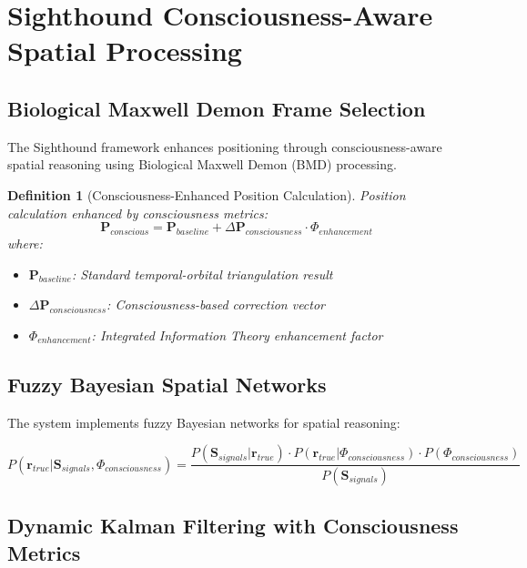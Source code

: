 \documentclass[12pt,a4paper]{article}
\newtheorem{definition}[theorem]{Definition}
\begin{document}
\section{Sighthound Consciousness-Aware Spatial Processing}

\subsection{Biological Maxwell Demon Frame Selection}

The Sighthound framework enhances positioning through consciousness-aware spatial reasoning using Biological Maxwell Demon (BMD) processing.

\begin{definition}[Consciousness-Enhanced Position Calculation]
Position calculation enhanced by consciousness metrics:
\begin{equation}
\mathbf{P}_{conscious} = \mathbf{P}_{baseline} + \Delta\mathbf{P}_{consciousness} \cdot \Phi_{enhancement}
\end{equation}
where:
\begin{itemize}
\item $\mathbf{P}_{baseline}$: Standard temporal-orbital triangulation result
\item $\Delta\mathbf{P}_{consciousness}$: Consciousness-based correction vector
\item $\Phi_{enhancement}$: Integrated Information Theory enhancement factor
\end{itemize}
\end{definition}

\subsection{Fuzzy Bayesian Spatial Networks}

The system implements fuzzy Bayesian networks for spatial reasoning:

\begin{equation}
P(\mathbf{r}_{true} | \mathbf{S}_{signals}, \Phi_{consciousness}) = \frac{P(\mathbf{S}_{signals} | \mathbf{r}_{true}) \cdot P(\mathbf{r}_{true} | \Phi_{consciousness}) \cdot P(\Phi_{consciousness})}{P(\mathbf{S}_{signals})}
\end{equation}

\subsection{Dynamic Kalman Filtering with Consciousness Metrics}
\end{document}
